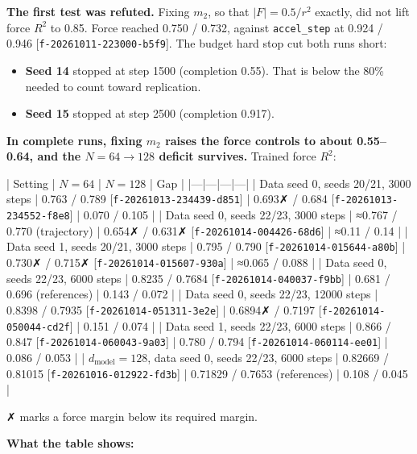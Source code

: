 \documentclass{article}
\begin{document}
\textbf{The first test was refuted.} Fixing $m_2$, so that $|F| = 0.5/r^2$ exactly, did not lift force $R^2$ to 0.85. Force reached 0.750 / 0.732, against \texttt{accel\_step} at 0.924 / 0.946 [\texttt{f-20261011-223000-b5f9}]. The budget hard stop cut both runs short:

\begin{itemize}
\item \textbf{Seed 14} stopped at step 1500 (completion 0.55). That is below the 80\% needed to count toward replication.
\item \textbf{Seed 15} stopped at step 2500 (completion 0.917).
\end{itemize}

\textbf{In complete runs, fixing $m_2$ raises the force controls to about 0.55–0.64, and the $N = 64 \to 128$ deficit survives.} Trained force $R^2$:

| Setting | $N = 64$ | $N = 128$ | Gap |
|---|---|---|---|
| Data seed 0, seeds 20/21, 3000 steps | 0.763 / 0.789 [\texttt{f-20261013-234439-d851}] | 0.693✗ / 0.684 [\texttt{f-20261013-234552-f8e8}] | 0.070 / 0.105 |
| Data seed 0, seeds 22/23, 3000 steps | ≈0.767 / 0.770 (trajectory) | 0.654✗ / 0.631✗ [\texttt{f-20261014-004426-68d6}] | ≈0.11 / 0.14 |
| Data seed 1, seeds 20/21, 3000 steps | 0.795 / 0.790 [\texttt{f-20261014-015644-a80b}] | 0.730✗ / 0.715✗ [\texttt{f-20261014-015607-930a}] | ≈0.065 / 0.088 |
| Data seed 0, seeds 22/23, 6000 steps | 0.8235 / 0.7684 [\texttt{f-20261014-040037-f9bb}] | 0.681 / 0.696 (references) | 0.143 / 0.072 |
| Data seed 0, seeds 22/23, 12000 steps | 0.8398 / 0.7935 [\texttt{f-20261014-051311-3e2e}] | 0.6894✗ / 0.7197 [\texttt{f-20261014-050044-cd2f}] | 0.151 / 0.074 |
| Data seed 1, seeds 22/23, 6000 steps | 0.866 / 0.847 [\texttt{f-20261014-060043-9a03}] | 0.780 / 0.794 [\texttt{f-20261014-060114-ee01}] | 0.086 / 0.053 |
| $d_{\text{model}} = 128$, data seed 0, seeds 22/23, 6000 steps | 0.82669 / 0.81015 [\texttt{f-20261016-012922-fd3b}] | 0.71829 / 0.7653 (references) | 0.108 / 0.045 |

✗ marks a force margin below its required margin.

\textbf{What the table shows:}
\end{document}
